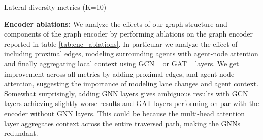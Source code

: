 \documentclass{article}
\begin{document}
\begin{table}[h!]
\begin{minipage}{.5\textwidth}
\centering
\caption{Lateral diversity metrics (K=10)}
\label{tab:dec_ablations_2}
\hfill
\end{minipage}
\begin{minipage}{.5\textwidth}
\centering
\caption{Longitudinal diversity metrics (K=10)}
\label{tab:dec_ablations_3}
\end{minipage}

\end{table}





\textbf{Encoder ablations:} We analyze the effects of our graph structure and components of the graph encoder by performing ablations on the graph encoder reported in table \ref{tab:enc_ablations}. In particular we analyze the effect of including proximal edges, modeling surrounding agents with agent-node attention and finally aggregating local context using GCN ~\citep{kipf2016semi} or GAT ~\citep{velivckovic2017graph} layers. We get improvement across all metrics by adding proximal edges, and agent-node attention, suggesting the importance of modeling lane changes and agent context. Somewhat surprisingly, adding GNN layers gives ambiguous results with GCN layers achieving slightly worse results and GAT layers performing on par with the encoder without GNN layers. This could be because the multi-head attention layer aggregates context across the entire traversed path, making the GNNs redundant.   
\end{document}
